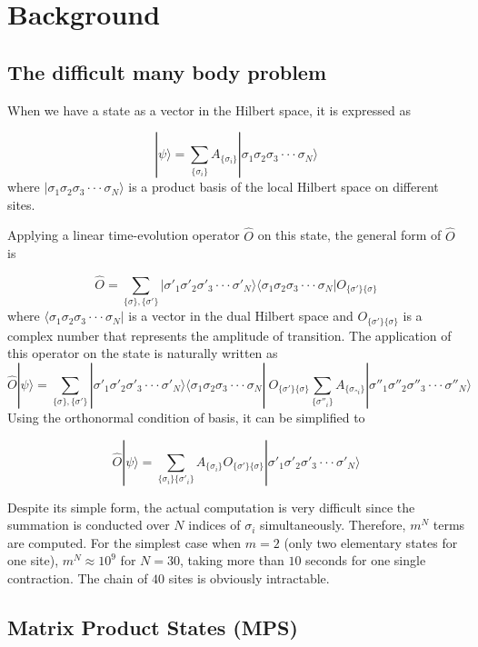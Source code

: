 \documentclass[english]{article}
\begin{document}
\section{Background}

\subsection{The difficult many body problem}

When we have a state as a vector in the Hilbert space, it is expressed
as

\[
|\psi\rangle=\sum_{\{\sigma_{i}\}}A_{\{\sigma_{i}\}}|\sigma_{1}\sigma_{2}\sigma_{3}\cdot\cdot\cdot\sigma_{N}\rangle
\]
where $|\sigma_{1}\sigma_{2}\sigma_{3}\cdot\cdot\cdot\sigma_{N}\rangle$
is a product basis of the local Hilbert space on different sites.

Applying a linear time-evolution operator $\hat{O}$ on this state,
the general form of $\hat{O}$ is

\[
\hat{O}=\sum_{\{\sigma\},\{\sigma'\}}|\sigma'_{1}\sigma'_{2}\sigma'_{3}\cdot\cdot\cdot\sigma'_{N}\rangle\langle\sigma_{1}\sigma_{2}\sigma_{3}\cdot\cdot\cdot\sigma_{N}|O_{\{\sigma'\}\{\sigma\}}
\]
where $\langle\sigma_{1}\sigma_{2}\sigma_{3}\cdot\cdot\cdot\sigma_{N}|$ is a vector in the dual Hilbert space and $O_{\{\sigma'\}\{\sigma\}}$ is a complex number that represents the amplitude of transition. The application of this operator on the state is naturally written as
\[
\hat{O}|\psi\rangle=\sum_{\{\sigma\},\{\sigma'\}}|\sigma'_{1}\sigma'_{2}\sigma'_{3}\cdot\cdot\cdot\sigma'_{N}\rangle\langle\sigma_{1}\sigma_{2}\sigma_{3}\cdot\cdot\cdot\sigma_{N}|\ O_{\{\sigma'\}\{\sigma\}}\sum_{\{\sigma''_{i}\}}A_{\{\sigma_{''i}\}}|\sigma''_{1}\sigma''_{2}\sigma''_{3}\cdot\cdot\cdot\sigma''_{N}\rangle
\]
Using the orthonormal condition of basis, it can be simplified to

\[
\hat{O}|\psi\rangle=\sum_{\{\sigma_{i}\}\{\sigma'_{i}\}}A_{\{\sigma_{i}\}}O_{\{\sigma'\}\{\sigma\}}|\sigma'_{1}\sigma'_{2}\sigma'_{3}\cdot\cdot\cdot\sigma'_{N}\rangle
\]


Despite its simple form, the actual computation is very difficult since
the summation is conducted over $N$ indices of $\sigma_{i}$
simultaneously. Therefore, $m^{N}$ terms are computed. For the simplest case when
$m=2$ (only two elementary states for one site), $m^{N}\approx10^{9}$
for $N=30$, taking more than $10$ seconds for one single contraction.
The chain of $40$ sites is obviously intractable.


\subsection{Matrix Product States (MPS)}
\end{document}
